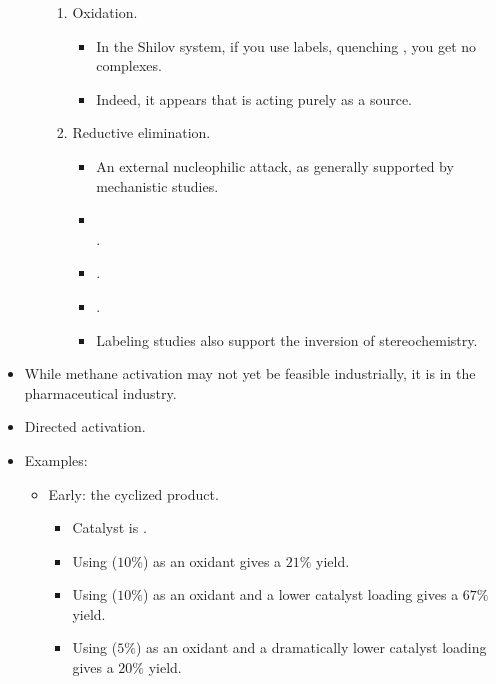 \documentclass[../notes.tex]{subfiles}
\begin{document}
\begin{itemize}
\begin{itemize}
\begin{enumerate}
            \item Oxidation.
            \begin{itemize}
                \item In the Shilov system, if you use labels, quenching , you get no  complexes.
                \item Indeed, it appears that  is acting purely as a  source.
            \end{itemize}
            \item Reductive elimination.
            \begin{itemize}
                \item An external nucleophilic attack, as generally supported by mechanistic studies.
                \item {}\\ .
                \item {}.
                \item {}.
                \item Labeling studies also support the inversion of stereochemistry.
            \end{itemize}
        \end{enumerate}
    \end{itemize}
    \item While methane activation may not yet be feasible industrially, it is in the pharmaceutical industry.
    \item Directed  activation.
    \item Examples:
    \begin{itemize}
        \item Early:  the cyclized product.
        \begin{itemize}
            \item Catalyst is .
            \item Using  ($10\%$) as an oxidant gives a $21\%$ yield.
            \item Using  ($10\%$) as an oxidant and a lower catalyst loading gives a $67\%$ yield.
            \item Using  ($5\%$) as an oxidant and a dramatically lower catalyst loading gives a $20\%$ yield.

\end{itemize}
\end{itemize}
\end{itemize}
\end{document}
